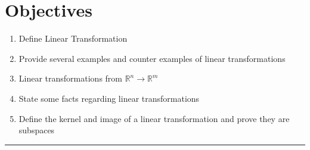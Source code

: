 %


\section*{Objectives}
\begin{enumerate}
	\item Define Linear Transformation
	\item Provide several examples and counter examples of linear transformations 
	\item Linear transformations from $\mathbb{R}^n \to \mathbb{R}^m$
	\item State some facts regarding linear transformations 
 	\item Define the kernel and image of a linear transformation and prove they are subspaces
    
\end{enumerate}






\rule[0.01in]{\textwidth}{0.0025in}



